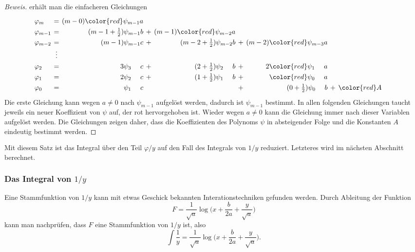 \begin{proof}[Beweis]
erhält man die einfacheren Gleichungen
\begin{equation}
\renewcommand{\arraycolsep}{2pt}
\renewcommand{\arraystretch}{1.3}
\begin{array}{lcrcrcrcrcrcrcr}
\varphi_m
&=&
(m-0){\color{red}\psi_{m-1}}a & &     & & 
& &
\\
\varphi_{m-1}
&=&
(m-1+\frac12)\psi_{m-1}b
&+&
(m-1){\color{red}\psi_{m-2}}a
& &
& &
\\
\varphi_{m-2}
&=&
(m-1)\psi_{m-1}c
&+&
(m-2+\frac12)\psi_{m-2}b
&+&
(m-2){\color{red}\psi_{m-3}}a
& &
\\
&\vdots&&&&&&&&&&&
\\
\varphi_2
&=&
3\psi_{3\phantom{-m}}c
&+&
(2+\frac12)\psi_{2\phantom{-m}}b
&+&
2{\color{red}\psi_{1\phantom{-m}}}a
& &
\\
\varphi_1
&=&
2\psi_{2\phantom{-m}}c
&+&
(1+\frac12)\psi_{1\phantom{-m}}b
&+&
{\color{red}\psi_{0\phantom{-m}}}a
& &
\\
\varphi_0
&=&
\psi_{1\phantom{-m}}c
& &
&+&
(0+\frac12) \psi_{0\phantom{-m}}b
&+&{\color{red}A}
\end{array}
\end{equation}
Die erste Gleichung kann wegen $a\ne 0$ nach $\psi_{m-1}$ aufgelöst werden,
dadurch ist $\psi_{m-1}$ bestimmt.
In allen folgenden Gleichungen taucht jeweils ein neuer Koeffizient
von $\psi$ auf, der rot hervorgehoben ist.
Wieder wegen $a\ne 0$ kann die Gleichung immer nach dieser Variablen
aufgelöst werden.
Die Gleichungen zeigen daher, dass die Koeffizienten des Polynoms $\psi$
in absteigender Folge und die Konstanten $A$ eindeutig bestimmt werden.
\end{proof}

Mit diesem Satz ist das Integral über den Teil $\varphi/y$ auf den
Fall des Integrals von $1/y$ reduziert.
Letzteres wird im nächsten Abschnitt berechnet.

%
%
\subsubsection{Das Integral von $1/y$}
Eine Stammfunktion von $1/y$ kann mit etwas Geschick bekannten
Interationstechniken gefunden werden.
Durch Ableitung der Funktion
\[
F
=
\frac{1}{\sqrt{a}}\log\biggl(x+\frac{b}{2a}+\frac{y}{\sqrt{a}}\biggr)
\]
kann man nachprüfen, dass $F$ eine Stammfunktion von $1/y$ ist,
also
\begin{equation}
\int
\frac{1}{y}
=
\frac{1}{\sqrt{a}}\log\biggl(x+\frac{b}{2a}+\frac{y}{\sqrt{a}}\biggr).
\end{equation}


